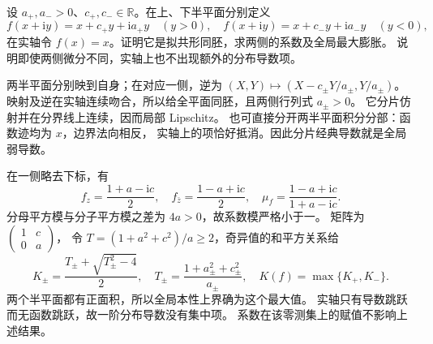 \begin{exercise}\label{b3:ex:B-4}
设 \(a_+,a_->0\)、\(c_+,c_-\in\mathbb R\)。在上、下半平面分别定义
\[
 f(x+\mathrm i y)=x+c_+y+\mathrm i a_+y\quad(y>0),\quad
 f(x+\mathrm i y)=x+c_-y+\mathrm i a_-y\quad(y<0),
\]
在实轴令 \(f(x)=x\)。证明它是拟共形同胚，求两侧的系数及全局最大膨胀。
说明即使两侧微分不同，实轴上也不出现额外的分布导数项。
\end{exercise}
\begin{solution}
两半平面分别映到自身；在对应一侧，逆为
\((X,Y)\mapsto(X-c_\pm Y/a_\pm,Y/a_\pm)\)。
映射及逆在实轴连续吻合，所以给全平面同胚，且两侧行列式 \(a_\pm>0\)。
它分片仿射并在分界线上连续，因而局部 Lipschitz。
也可直接分开两半平面积分分部：函数迹均为 \(x\)，边界法向相反，
实轴上的项恰好抵消。因此分片经典导数就是全局弱导数。

在一侧略去下标，有
\[
 f_z=\frac{1+a-\mathrm i c}{2},\quad
 f_{\bar z}=\frac{1-a+\mathrm i c}{2},\quad
 \mu_f=\frac{1-a+\mathrm i c}{1+a-\mathrm i c}.
\]
分母平方模与分子平方模之差为 \(4a>0\)，故系数模严格小于一。
矩阵为 \(\left(\begin{smallmatrix}1&c\\0&a\end{smallmatrix}\right)\)，
令 \(T=(1+a^2+c^2)/a\ge2\)，奇异值的和平方关系给
\[
 K_\pm=\frac{T_\pm+\sqrt{T_\pm^2-4}}2,\quad
 T_\pm=\frac{1+a_\pm^2+c_\pm^2}{a_\pm},\quad
 K(f)=\max\{K_+,K_-\}.
\]
两个半平面都有正面积，所以全局本性上界确为这个最大值。
实轴只有导数跳跃而无函数跳跃，故一阶分布导数没有集中项。
系数在该零测集上的赋值不影响上述结果。
\end{solution}

